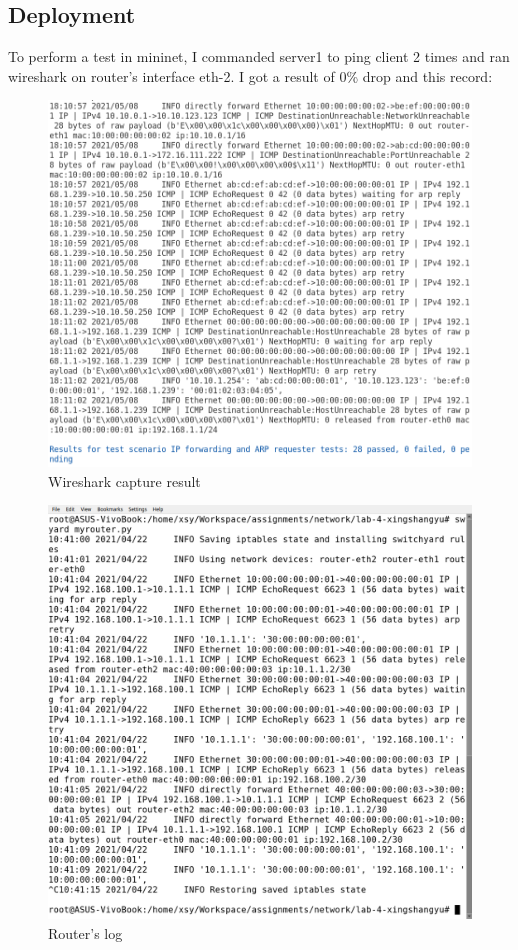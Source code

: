 \documentclass[12pt,a4paper,UTF8]{article}
\begin{document}
\subsection{Deployment}
To perform a test in mininet, I commanded server1 to ping client 2 times and ran wireshark on router's interface eth-2. I got a result of 0\% drop and this record:
\begin{figure}[htbp]
	\centering
	\includegraphics[width=\textwidth]{2}
	\caption{Wireshark capture result}
\end{figure}
\begin{figure}[htbp]
	\centering
	\includegraphics[width=\textwidth]{3}
	\caption{Router's log}
\end{figure}
\end{document}
